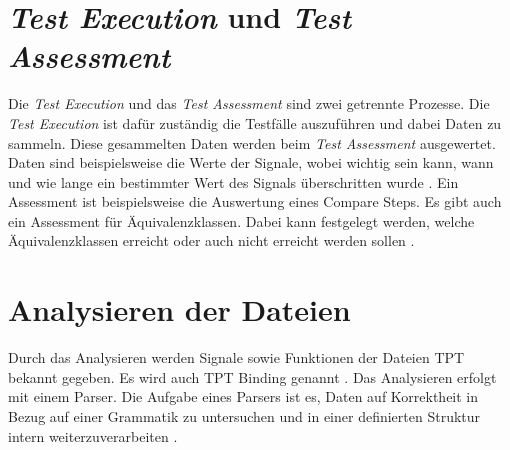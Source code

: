 \section*{\textit{Test Execution} und \textit{Test Assessment}}
Die \textit{Test Execution} und das \textit{Test Assessment} sind zwei getrennte Prozesse.  
Die \textit{Test Execution} ist dafür zuständig die Testfälle auszuführen und dabei Daten zu sammeln. %
Diese gesammelten Daten werden beim \textit{Test Assessment} ausgewertet. 
Daten sind beispielsweise die Werte der Signale, wobei wichtig sein kann, wann und wie lange ein  bestimmter Wert des Signals überschritten wurde \parencite[S. 1212 ff.]{userguide}.
Ein Assessment ist beispielsweise die Auswertung eines Compare Steps.
Es gibt auch ein Assessment für Äquivalenzklassen. Dabei kann festgelegt werden, welche Äquivalenzklassen erreicht oder auch nicht erreicht werden sollen \parencite[S. 41 ff.]{tpttutorial}.

\section*{Analysieren der Dateien}
Durch das Analysieren werden Signale sowie Funktionen der Dateien TPT bekannt gegeben. Es wird auch TPT Binding genannt \parencite[S. 870 ff.]{userguide}.
Das Analysieren erfolgt mit einem Parser. 
Die Aufgabe eines Parsers ist es, Daten auf Korrektheit in Bezug auf einer \glqq Grammatik\grqq{} zu untersuchen und in einer definierten
Struktur intern weiterzuverarbeiten \parencite[S. 1 ff.]{parser}.

